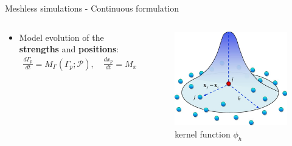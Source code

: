 \documentclass[aspectratio=169]{beamer} %
\begin{document}
\begin{frame}{Meshless simulations - Continuous formulation}
\begin{columns}[t]
\begin{column}{0.7\textwidth}
\begin{itemize}
                \item Model evolution of the \textbf{strengths} and \textbf{positions}:
                      \begin{eqnarray*}
                          \frac{d\Gamma_p}{dt} = M_\Gamma(\Gamma_p; \mathcal P), \quad \frac{d x_p}{d t} = M_x(x_p; \mathcal P)
                      \end{eqnarray*}
            \end{itemize}
        \end{column}
        \begin{column}{0.3\textwidth}
            \begin{figure}
                \includegraphics[width=\textwidth]{../../conference/images/kernel.png}
                \caption*{ kernel function $\phi_h$}
            \end{figure}
        \end{column}
    \end{columns}
\end{frame}


\end{document}
